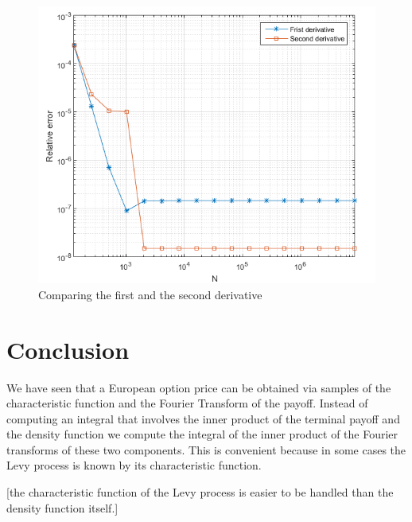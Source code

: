 \documentclass[12pt]{report}
\begin{document}
\begin{figure}[H]

\centering
\includegraphics[scale=0.7]{1st2nd.png} 
\caption{Comparing the first and the second derivative}
\end{figure}
\chapter{Conclusion }
We have seen that a European option price can be obtained via samples of the characteristic function and the Fourier Transform of the payoff. Instead of computing an integral that involves the inner product of the terminal payoff and the density function we compute the integral of the inner product of the  Fourier transforms of these two components. This is convenient because in some cases the Levy process is known by its characteristic function.

[the characteristic function  of the Levy process is easier to be handled than the density function itself.]\\

\newpage
\appendix
\end{document}
